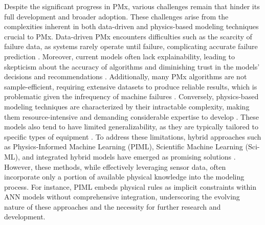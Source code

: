 \documentclass[runningheads]{llncs}
\begin{document}
Despite the significant progress in PMx, various challenges remain that hinder its full development and broader adoption. These challenges arise from the complexities inherent in both data-driven and physics-based modeling techniques crucial to PMx. Data-driven PMx encounters difficulties such as the scarcity of failure data, as systems rarely operate until failure, complicating accurate failure prediction \cite{alimohammadi2022predict,wen2022recent}. Moreover, current models often lack explainability, leading to skepticism about the accuracy of algorithms and diminishing trust in the models' decisions and recommendations \cite{shukla2020opportunities}. Additionally, many PMx algorithms are not sample-efficient, requiring extensive datasets to produce reliable results, which is problematic given the infrequency of machine failures \cite{wen2022recent}. Conversely, physics-based modeling techniques are characterized by their intractable complexity, making them resource-intensive and demanding considerable expertise to develop \cite{aivaliotis2019methodology}. These models also tend to have limited generalizability, as they are typically tailored to specific types of equipment \cite{boje2020towards}. To address these limitations, hybrid approaches such as Physics-Informed Machine Learning (PIML), Scientific Machine Learning (Sci-ML), and integrated hybrid models have emerged as promising solutions \cite{sepe2021physics,nascimento2019fleet}. However, these methods, while effectively leveraging sensor data, often incorporate only a portion of available physical knowledge into the modeling process. For instance, PIML embeds physical rules as implicit constraints within ANN models without comprehensive integration, underscoring the evolving nature of these approaches and the necessity for further research and development.


\end{document}
